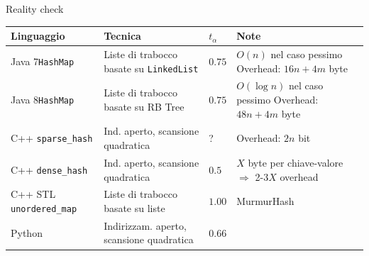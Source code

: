 \begin{frame}[shrink=10]{Reality check}

{\renewcommand*{\arraystretch}{1.4}
\begin{tabular}{|P{2.5cm}|P{4.0cm}|P{0.6cm}|P{4.3cm}|}
\hline
\textbf{Linguaggio} & \textbf{Tecnica} & $t_\alpha$ & \textbf{Note} 
\\ \hline
%
Java 7\newline \texttt{HashMap} &
Liste di trabocco basate su \texttt{LinkedList} &
$0.75$ &
$O(n)$ nel caso pessimo \newline
Overhead: $16n + 4m$ byte
\\ \hline
%
Java 8\newline \texttt{HashMap} &
Liste di trabocco basate su RB Tree &
$0.75$ &
$O(\log n)$ nel caso pessimo \newline
Overhead: $48n + 4m$ byte
\\ \hline
C++ \newline \texttt{sparse\_hash} &
Ind. aperto, scansione quadratica & 
? &
Overhead: $2n$ bit
\\ \hline
C++ \newline \texttt{dense\_hash} &
Ind. aperto, scansione quadratica & 
$0.5$ &
$X$ byte per chiave-valore $\Rightarrow$ 2-3$X$ overhead
\\ \hline
C++ STL \newline \texttt{unordered\_map} &
Liste di trabocco basate su liste &
$1.00$ &
MurmurHash
\\ \hline
Python &
Indirizzam. aperto, scansione quadratica &
$0.66$ &
\\ \hline
\end{tabular}
}
\end{frame}






